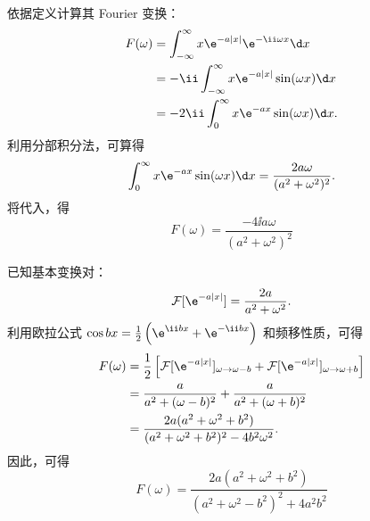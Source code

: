 \begin{solution}

    依据定义计算其 Fourier 变换：
    \begin{equation}\label{eq:p2s1-ft}
        \begin{aligned}
            F(\omega) & = \int_{-\infty}^{\infty} x\e^{-a|x|} \e^{-\ii\omega x} \d x   \\
                      & = -\ii \int_{-\infty}^{\infty} x\e^{-a|x|} \sin(\omega x) \d x \\
                      & = -2\ii \int_0^\infty x\e^{-ax} \sin(\omega x) \d x.
        \end{aligned}
    \end{equation}
    利用分部积分法，可算得
    \begin{equation}\label{eq:p2s1-int}
        \int_0^\infty x\e^{-ax} \sin(\omega x) \d x = \frac{2a\omega}{(a^2+\omega^2)^2}.
    \end{equation}
    将代入，得
    \begin{equation}
        \boxed{F(\omega) = \frac{-4\ii a\omega}{(a^2+\omega^2)^2}}
    \end{equation}


    已知基本变换对：
    \begin{equation}\label{eq:p2s2-basic}
        \mathcal{F}[\e^{-a|x|}] = \frac{2a}{a^2+\omega^2}.
    \end{equation}
    利用欧拉公式 $\cos bx = \frac{1}{2}\left( \e^{\ii bx} + \e^{-\ii bx} \right)$ 和频移性质，可得
    \begin{equation}\label{eq:p2s2-shift}
        \begin{aligned}
            F(\omega) & = \frac{1}{2} \left[ \mathcal{F}[\e^{-a|x|}]_{\omega \to \omega - b} + \mathcal{F}[\e^{-a|x|}]_{\omega \to \omega + b} \right] \\
                      & = \frac{a}{a^2+(\omega-b)^2} + \frac{a}{a^2+(\omega+b)^2}                                                                      \\
                      & = \frac{2a(a^2+\omega^2+b^2)}{(a^2+\omega^2+b^2)^2 - 4b^2\omega^2}.
        \end{aligned}
    \end{equation}
    因此，可得
    \begin{equation}
        \boxed{F(\omega) = \frac{2a(a^2+\omega^2+b^2)}{(a^2+\omega^2-b^2)^2 + 4a^2b^2}}
    \end{equation}


\end{solution}
